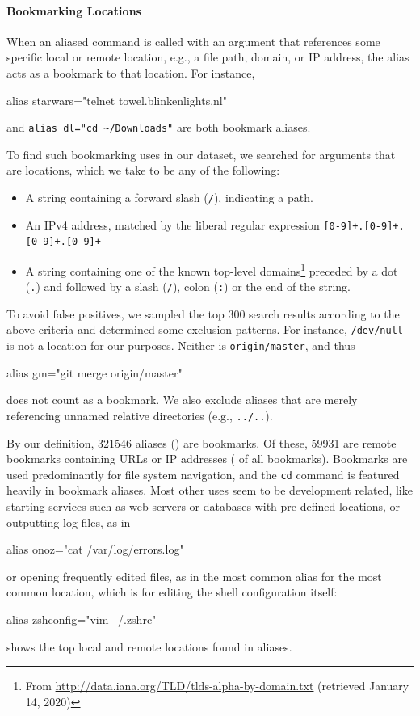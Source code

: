 \paragraph{\bf Bookmarking Locations}

When an aliased command is called with an argument that references some specific local or remote location, e.g., a file path, domain, or IP address, the alias acts as a bookmark to that location.
For instance,
\begin{CVerbatim}
alias starwars="telnet towel.blinkenlights.nl"    
\end{CVerbatim}
and \verb|alias dl="cd ~/Downloads"|
are both bookmark aliases.

To find such bookmarking uses in our dataset, we searched for arguments that are locations, which we take to be any of the following:
\begin{itemize}
    \item A string containing a forward slash (\verb|/|), indicating a path.
    \item An IPv4 address, matched by the liberal regular expression \verb|[0-9]+.[0-9]+.[0-9]+.[0-9]+|
    \item A string containing one of the known top-level domains\footnote{From \url{http://data.iana.org/TLD/tlds-alpha-by-domain.txt} (retrieved January 14, 2020)} preceded by a dot (\verb|.|) and followed by a slash (\verb|/|), colon (\verb|:|) or the end of the string.
\end{itemize}
To avoid false positives, we sampled the top 300 search results according to the above criteria and determined some exclusion patterns.
For instance, \texttt{/dev/null} is not a location for our purposes.
Neither is \texttt{origin/master}, and thus 
\begin{CVerbatim}
alias gm="git merge origin/master"
\end{CVerbatim}
does not count as a bookmark.
We also exclude aliases that are merely referencing unnamed relative directories (e.g., \verb|../..|).

By our definition, \num{321546} aliases () are bookmarks.
Of these, \num{59931} are remote bookmarks containing URLs or IP addresses ( of all bookmarks).
Bookmarks are used predominantly for file system navigation, and the \verb|cd| command is featured heavily in bookmark aliases.
Most other uses seem to be development related, like starting services such as web servers or databases with pre-defined locations,
or outputting log files, as in
\begin{CVerbatim}
alias onoz="cat /var/log/errors.log"
\end{CVerbatim}
or opening frequently edited files, as in the most common alias for the most common location, which is for editing the shell configuration itself:
\begin{CVerbatim}
alias zshconfig="vim ~/.zshrc"
\end{CVerbatim}
 shows the top local and remote locations found in aliases.


